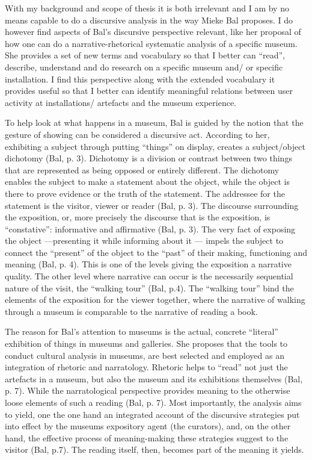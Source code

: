 With my background and scope of thesis it is both irrelevant and I am by no means capable to do a discursive analysis in the way Mieke Bal proposes. I do however find aspects of Bal’s discursive perspective relevant, like her proposal of how one can do a narrative-rhetorical systematic analysis of a specific museum. She provides a set of new terms and vocabulary so that I better can “read”, describe, understand and do research on a specific museum and/ or specific installation. I find this perspective along with the extended vocabulary it provides useful so that I better can identify meaningful relations between user activity at installations/ artefacts and the museum experience.

To help look at what happens in a museum, Bal is guided by the notion that the gesture of showing can be considered a discursive act. According to her, exhibiting a subject through putting “things” on display, creates a subject/object dichotomy (Bal, p. 3). Dichotomy is a division or contrast between two things that are represented as being opposed or entirely different. The dichotomy enables the subject to make a statement about the object, while the object is there to prove evidence or the truth of the statement. The addressee for the statement is the visitor, viewer or reader (Bal, p. 3). The discourse surrounding the exposition, or, more precisely the discourse that is the exposition, is “constative”: informative and affirmative (Bal, p. 3). The very fact of exposing the object —presenting it while informing about it — impels the subject to connect the “present” of the object to the “past” of their making, functioning and meaning (Bal, p. 4). This is one of the levels giving the exposition a narrative quality. The other level where narrative can occur is the necessarily sequential nature of the visit, the “walking tour” (Bal, p.4). The “walking tour” bind the elements of the exposition for the viewer together, where the narrative of walking through a museum is comparable to the narrative of reading a book.

The reason for Bal’s attention to museums is the actual, concrete “literal” exhibition of things in museums and galleries. She proposes that the tools to conduct cultural analysis in museums, are best selected and employed as an integration of rhetoric and narratology. Rhetoric helps to “read” not just the artefacts in a museum, but also the museum and its exhibitions themselves (Bal, p. 7). While the narratological perspective provides meaning to the otherwise loose elements of such a reading (Bal, p. 7). Most importantly, the analysis aims to yield, one the one hand an integrated account of the discursive strategies put into effect by the museums expository agent (the curators), and, on the other hand, the effective process of meaning-making these strategies suggest to the visitor (Bal, p.7). The reading itself, then, becomes part of the meaning it yields.

